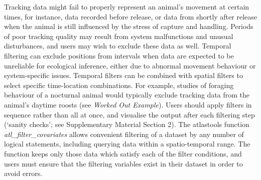 Tracking data might fail to properly represent an animal's movement at certain times, for instance, data recorded before release, or data from shortly after release when the animal is still influenced by the stress of capture and handling.
Periods of poor tracking quality may result from system malfunctions and unusual disturbances, and users may wish to exclude these data as well.
Temporal filtering can exclude positions from intervals when data are expected to be unreliable for ecological inference, either due to abnormal movement behaviour or system-specific issues.  
Temporal filters can be combined with spatial filters to select specific time-location combinations. 
For example, studies of foraging behaviour of a nocturnal animal would typically exclude tracking data from the animal's daytime roosts (see \textit{Worked Out Example}).
Users should apply filters in sequence rather than all at once, and visualise the output after each filtering step (`sanity checks'; see Supplementary Material Section 2).
The atlastools function \textit{atl\_filter\_covariates} allows convenient filtering of a dataset by any number of logical statements, including querying data within a spatio-temporal range.
The function keeps only those data which satisfy each of the filter conditions, and users must ensure that the filtering variables exist in their dataset in order to avoid errors.


